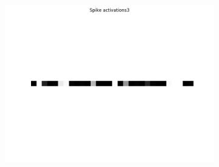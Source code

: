 \begin{figure}
\begin{subfigure}[t]{.24\textwidth}
  		\label{fig:sub2}
	\end{subfigure}
	\begin{subfigure}[t]{.24\textwidth}
  		\centering
  		\includegraphics[width=.9\linewidth]{imgs/convert/cuba00003.png}
  		\label{fig:sub2}
	\end{subfigure}	
	

\end{figure}
